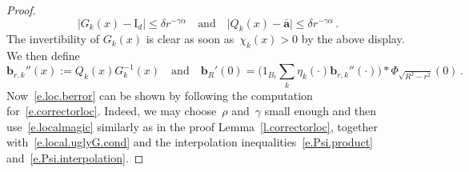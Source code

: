 \documentclass[11pt]{article} %
\numberwithin{equation}{section}
\theoremstyle{definition}
\newcommand*{\Id}{\ensuremath{\mathrm{I}_d}}
\renewcommand{\b}{\ensuremath{\mathbf{b}}}
\newcommand{\qand}{\quad \mbox{and} \quad }
\renewcommand{\a}{\mathbf{a}}
\newcommand{\ahom}{\bar{\a}}
\newcommand{\indc}{1}
\newcommand{\minscale}{\chi}
\begin{document}
\begin{proof}
\begin{equation}  \label{e.Jk.Qk}
\big| G_{k}(x) - \Id \big| \leq \delta r^{- \gamma\alpha} 
\qand 
\big| Q_{k}(x) - \ahom \big| \leq \delta r^{- \gamma\alpha} 
\,.
\end{equation}
The invertibility of $G_{k}(x)$ is clear as soon as~$\minscale_{k}(x)>0$ by the above display. We then define 
\begin{equation*}  
\b_{r,k}''(x) := Q_{k}(x)  G_{k}^{-1}(x)
\qand
\b_R'(0) = \biggl( \indc_{B_t} \sum_{k} \eta_k(\cdot)  \b_{r,k}''(\cdot) \biggr)  \ast \Phi_{\sqrt{R^2-r^2}}(0)\,.
\end{equation*}
Now~\eqref{e.loc.berror} can be shown by following the computation for~\eqref{e.correctorloc}. Indeed, we may choose~$\rho$ and~$\gamma$ small enough and then use~\eqref{e.localmagic} similarly as in the proof Lemma~\ref{l.correctorloc}, together with~\eqref{e.local.uglyG.cond} and the interpolation inequalities~\eqref{e.Psi.product} and~\eqref{e.Psi.interpolation}.

\smallskip


\end{proof}
\end{document}
